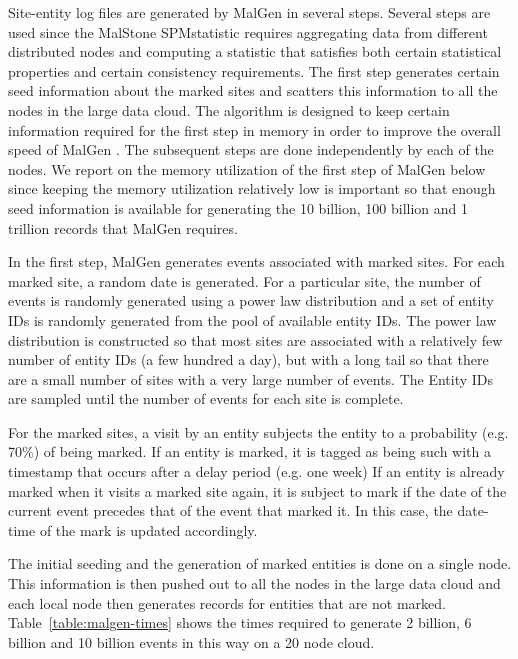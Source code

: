 \documentclass{acm_proc_article-sp}
\def\spm{\mbox{SPM}}
\def\malstone{MalStone } \def\malgen{MalGen }
\begin{document}
Site-entity log files are generated by \malgen in several steps. 
Several steps are used since the \malstone \spm statistic
requires aggregating data from different distributed nodes and
computing a statistic that satisfies both certain statistical properties
and certain consistency requirements.  The
first step generates certain seed information about the marked sites and scatters
this information to all the nodes in the large data cloud.   The
algorithm is designed to keep certain information required for the
first step  in memory in order to improve the overall speed of \malgen.  
The subsequent steps are done independently by each of the nodes.
We report on the memory utilization of the first step of \malgen below since keeping
the memory utilization relatively low is important so that enough seed
information is available for generating the 10 billion, 100 billion
and 1 trillion records that \malgen requires.

In the first step, \malgen generates events associated with marked sites.
For each marked site, a random date is generated. 
For a particular site, the number of events is randomly
generated using a power law distribution and a set of entity IDs is
randomly generated from the pool of available entity IDs. The power
law distribution is constructed so that most sites are associated with
a relatively few number of entity IDs (a few hundred a day), but with
a long tail so that there are a small number of sites with a very
large number of events.  The Entity IDs are sampled until the
number of events for each site is complete.

For the marked sites, a visit by an entity subjects
the entity to a probability (e.g. 70\%) of being marked.
If an entity is marked, it is tagged as being such with a
timestamp that occurs after a delay period (e.g. one week)
If an entity is already marked when it 
visits a marked site again, it is subject to mark if the date of
the current event precedes that of the event that marked it. 
In this case, the date-time of the mark is updated
accordingly. 

The initial seeding and the generation of marked entities is done
on a single node.  This information is then pushed out to all the nodes
in the large data cloud and each local node then generates records for entities
that are not marked.  Table~\ref{table:malgen-times} shows the times
required to generate 2 billion, 6 billion and 10 billion events in this
way on a 20 node cloud.
\end{document}
